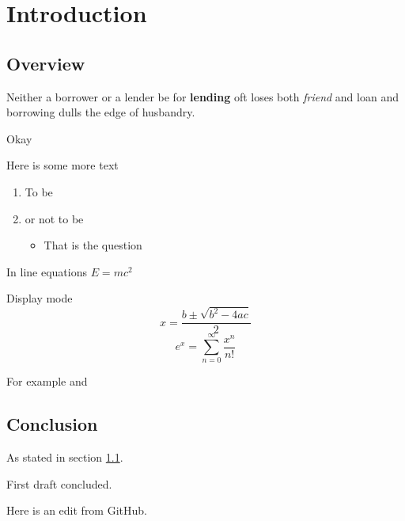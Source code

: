 \chapter{Introduction}

\section{Overview}
\label{Sec:Overview}

Neither a borrower or a lender be for \textbf{lending} oft loses both \textit{friend} and loan and borrowing dulls the edge of husbandry.

 Okay
 
 Here is some more text

\begin{enumerate}
\item To be
\item or not to be
\begin{itemize}
\item That is the question
\end{itemize}
\end{enumerate}

In line equations $E=mc^2$

Display mode
\[
x = \frac{b\pm\sqrt{b^2-4ac}}{2}
\]
\[
e^x = \sum_{n=0}^\infty \frac{x^n}{n!}
\]

For example \cite[Section 3]{Bunce2003ThePreduals} and \cite{Kaup1977AlgebraicBanachmanifolds}

\section{Conclusion}

As stated in section \ref{Sec:Overview}.

First draft concluded.

Here is an edit from GitHub.

